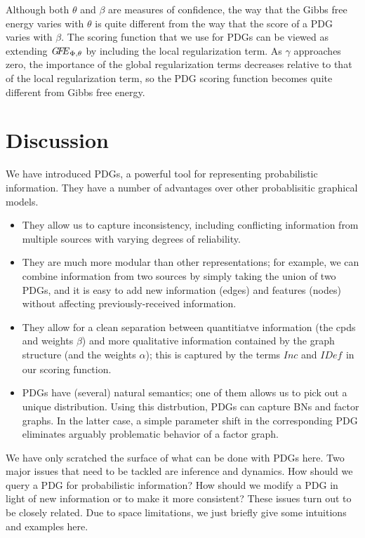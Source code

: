 \documentclass[letterpaper]{article} %
\theoremstyle{plain}
\theoremstyle{definition}
\theoremstyle{remark}
\newcommand{\IDef}[1]{\mathit{IDef}_{\!#1}}
\newcommand\Inc{\mathit{Inc}}
\newcommand\GFE{\mathit{G\mkern-4mu F\mkern-4.5mu E}}
\begin{document}
Although both $\theta$ and $\beta$ are measures of confidence, 
the way that the Gibbs free energy varies with $\theta$ 
is quite different from the way that the score of a PDG
varies with $\beta$. 
The scoring function that we use for PDGs can be viewed as
extending ${\GFE}_{\Phi,\theta}$ by including
the local regularization term.
As $\gamma$ approaches zero,
the importance of the global regularization terms decreases relative
to that of the local regularization term, so the PDG scoring function
becomes quite different from Gibbs free energy.

\section{Discussion}
We have introduced PDGs, a powerful tool for representing
probabilistic information. 
They have a number of advantages over other
probablisitic graphical models. 
\begin{itemize}
\item They allow us to capture inconsistency, including conflicting information
from multiple sources with varying degrees of reliability.
\item 
	They are much more modular 
	than other representations; for example, we can combine information from two sources by simply taking the union of two
	PDGs, and it is easy to add new information (edges)
	and features (nodes) without affecting previously-received information.
\item They allow for a clean separation between quantitiatve information (the
	cpds and weights $\beta$) and more qualitative information contained by
	the graph structure (and the weights $\alpha$); this is captured by the
	terms $\Inc$ and $\IDef{}$ in our scoring function.
\item PDGs have (several) natural semantics; one of them allows us to
pick out a unique distribution.  Using this distrbution, PDGs
	can capture BNs and factor graphs.
In the latter case, a simple parameter shift in the corresponding PDG eliminates
arguably problematic behavior of a factor graph.
\end{itemize}

We have only scratched the surface of what can be done with PDGs here.
Two major issues that need to be tackled are inference and dynamics.
How should we query a PDG for probabilistic information? How should 
we modify a PDG in light of new information or to make it more consistent?
These issues turn out to be closely related.
Due to space limitations, 
we just briefly give some intuitions and examples here.
\end{document}
